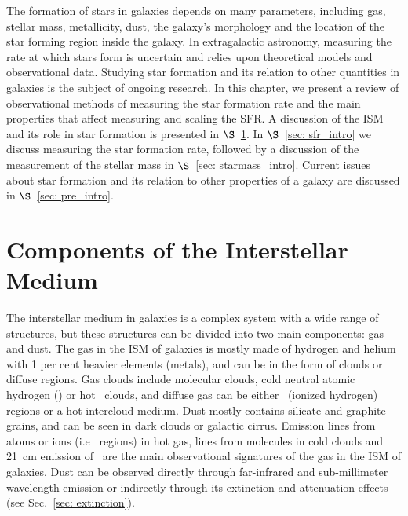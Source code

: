 The formation of stars in galaxies depends on many parameters, including gas, stellar mass, metallicity, dust, the galaxy's morphology and the location of the star forming region inside the galaxy.
In extragalactic astronomy, measuring the rate at which stars form is uncertain and relies upon theoretical models and observational data.
Studying star formation and its relation to other quantities in galaxies is the subject of ongoing research.
In this chapter, we present a review of observational methods of measuring the star formation rate and the main properties that affect measuring and scaling the SFR. A discussion of the ISM and its role in star formation is presented in $\S$~\ref{sec: ism_intro}. In $\S$~\ref{sec: sfr_intro} we discuss measuring the star formation rate, followed by a discussion of the measurement of the stellar mass in $\S$~\ref{sec: starmass_intro}. Current issues about star formation and its relation to other properties of a galaxy are discussed in $\S$~\ref{sec: pre_intro}. 




\section{Components of the Interstellar Medium} 
\label{sec: ism_intro}
The interstellar medium in galaxies is a complex system with a wide range of structures, but these structures can be divided into two main components: gas and dust.
The gas in the ISM of galaxies is mostly made of hydrogen and helium with 1 per cent heavier elements (metals), and can be in the form of clouds or diffuse regions.
Gas clouds include molecular clouds, cold neutral atomic hydrogen (\hi) or hot \hi~clouds, and diffuse gas can be either \hii~(ionized hydrogen) regions or a hot intercloud medium.
Dust mostly contains silicate and graphite grains, and can be seen in dark clouds or galactic cirrus. %
Emission lines from atoms or ions (i.e \hii~regions) in hot gas, lines from molecules in cold clouds and 21~cm emission of \hi~are the main observational signatures of the gas in the ISM of galaxies.
Dust can be observed directly through far-infrared and sub-millimeter wavelength emission or indirectly through its extinction and attenuation effects (see Sec.~\ref{sec: extinction}).

